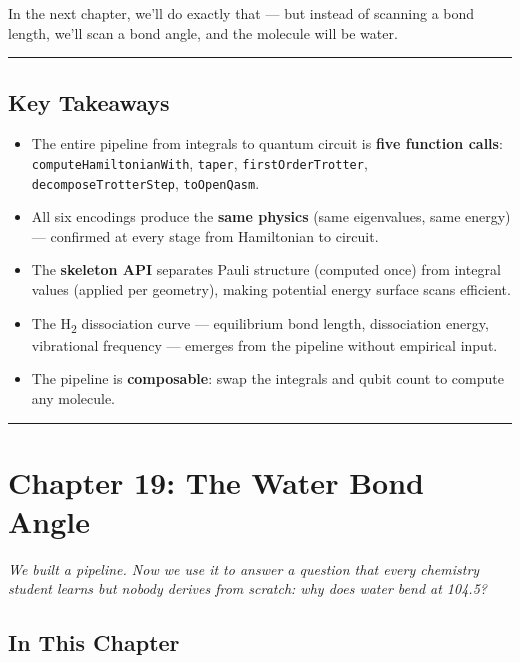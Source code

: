 \documentclass[
  11pt,
  oneside]{book}
\providecommand{\tightlist}{%
  \setlength{\itemsep}{0pt}\setlength{\parskip}{0pt}}
\begin{document}
In the next chapter, we'll do exactly that --- but instead of scanning a
bond length, we'll scan a bond angle, and the molecule will be water.

\begin{center}\rule{0.5\linewidth}{0.5pt}\end{center}

\section{Key Takeaways}\label{key-takeaways-17}

\begin{itemize}
\tightlist
\item
  The entire pipeline from integrals to quantum circuit is \textbf{five
  function calls}: \texttt{computeHamiltonianWith}, \texttt{taper},
  \texttt{firstOrderTrotter}, \texttt{decomposeTrotterStep},
  \texttt{toOpenQasm}.
\item
  All six encodings produce the \textbf{same physics} (same eigenvalues,
  same energy) --- confirmed at every stage from Hamiltonian to circuit.
\item
  The \textbf{skeleton API} separates Pauli structure (computed once)
  from integral values (applied per geometry), making potential energy
  surface scans efficient.
\item
  The H\textsubscript{2} dissociation curve --- equilibrium bond length, dissociation
  energy, vibrational frequency --- emerges from the pipeline without
  empirical input.
\item
  The pipeline is \textbf{composable}: swap the integrals and qubit
  count to compute any molecule.
\end{itemize}

\begin{center}\rule{0.5\linewidth}{0.5pt}\end{center}

\chapter{Chapter 19: The Water Bond
Angle}\label{chapter-19-the-water-bond-angle}

\emph{We built a pipeline. Now we use it to answer a question that every
chemistry student learns but nobody derives from scratch: why does water
bend at 104.5\textdegree{}?}

\section{In This Chapter}\label{in-this-chapter-18}
\end{document}
